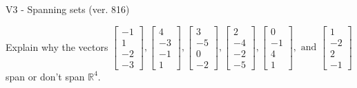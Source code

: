 \begin{exercise}
  \begin{exerciseTitle}V3 - Spanning sets (ver. 816)\end{exerciseTitle}
  \begin{exerciseStatement}
    Explain why the vectors \(\left[\begin{array}{r}
-1 \\
1 \\
-2 \\
-3
\end{array}\right] , \left[\begin{array}{r}
4 \\
-3 \\
-1 \\
1
\end{array}\right] , \left[\begin{array}{r}
3 \\
-5 \\
0 \\
-2
\end{array}\right] , \left[\begin{array}{r}
2 \\
-4 \\
-2 \\
-5
\end{array}\right] , \left[\begin{array}{r}
0 \\
-1 \\
4 \\
1
\end{array}\right] , \text{ and } \left[\begin{array}{r}
1 \\
-2 \\
2 \\
-1
\end{array}\right]\) span or don't span \(\mathbb{R}^4\). 
	



\end{exerciseStatement}
\end{exercise}
